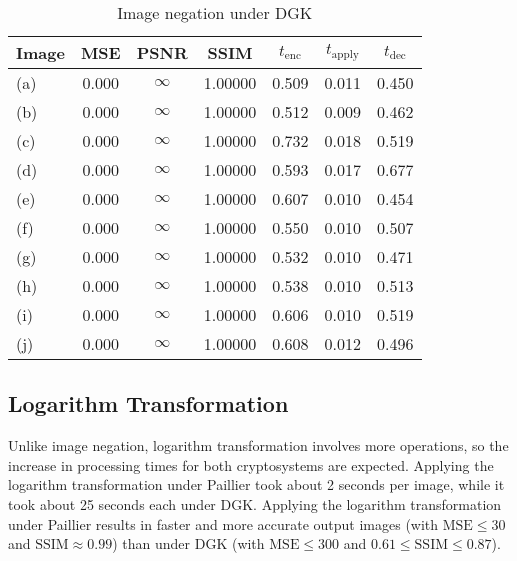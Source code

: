 \begin{table}[t]
	\centering
	\caption{Image negation under DGK}
	\label{tbl:neg-dgk}
    \begin{tabular}{lcccccc}
        \hline
        Image & MSE  & PSNR & SSIM & $t_\text{enc}$ & $t_\text{apply}$ & $t_\text{dec}$ \\ \hline
		(a) & 0.000 & $\infty$ & 1.00000 & 0.509 & 0.011 & 0.450 \\
		(b) & 0.000 & $\infty$ & 1.00000 & 0.512 & 0.009 & 0.462 \\
		(c) & 0.000 & $\infty$ & 1.00000 & 0.732 & 0.018 & 0.519 \\
		(d) & 0.000 & $\infty$ & 1.00000 & 0.593 & 0.017 & 0.677 \\
		(e) & 0.000 & $\infty$ & 1.00000 & 0.607 & 0.010 & 0.454 \\
		(f) & 0.000 & $\infty$ & 1.00000 & 0.550 & 0.010 & 0.507 \\
		(g) & 0.000 & $\infty$ & 1.00000 & 0.532 & 0.010 & 0.471 \\
		(h) & 0.000 & $\infty$ & 1.00000 & 0.538 & 0.010 & 0.513 \\
		(i) & 0.000 & $\infty$ & 1.00000 & 0.606 & 0.010 & 0.519 \\
		(j) & 0.000 & $\infty$ & 1.00000 & 0.608 & 0.012 & 0.496 \\
		\hline
        \end{tabular}
\end{table}

\subsection{Logarithm Transformation}
Unlike image negation, logarithm transformation involves more operations, so the increase in processing times for both cryptosystems are expected. Applying the logarithm transformation under Paillier took about 2 seconds per image, while it took about 25 seconds each under DGK. Applying the logarithm transformation under Paillier results in faster and more accurate output images (with $\text{MSE} \le 30$ and $\text{SSIM} \approx 0.99$) than under DGK (with $\text{MSE} \le 300$ and $0.61 \le \text{SSIM} \le 0.87$).


